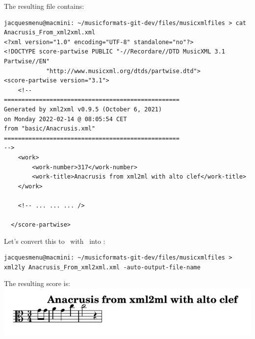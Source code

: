 The resulting file  contains:
\begin{lstlisting}[language=MusicXML]
jacquesmenu@macmini: ~/musicformats-git-dev/files/musicxmlfiles > cat Anacrusis_From_xml2xml.xml
<?xml version="1.0" encoding="UTF-8" standalone="no"?>
<!DOCTYPE score-partwise PUBLIC "-//Recordare//DTD MusicXML 3.1 Partwise//EN"
			"http://www.musicxml.org/dtds/partwise.dtd">
<score-partwise version="3.1">
    <!--
==================================================
Generated by xml2xml v0.9.5 (October 6, 2021)
on Monday 2022-02-14 @ 08:05:54 CET
from "basic/Anacrusis.xml"
==================================================
-->
    <work>
        <work-number>317</work-number>
        <work-title>Anacrusis from xml2ml with alto clef</work-title>
    </work>

	<!-- ... ... ... />
	
  </score-partwise>
\end{lstlisting}

Let's convert this to \lily\ with \xmlToLy\ into :
\begin{lstlisting}[language=Terminal]
jacquesmenu@macmini: ~/musicformats-git-dev/files/musicxmlfiles > xml2ly Anacrusis_From_xml2xml.xml -auto-output-file-name
\end{lstlisting}

The resulting score is:\\
\includegraphics[scale=0.7]{../graphics/Anacrusis_From_xml2xml.png}

